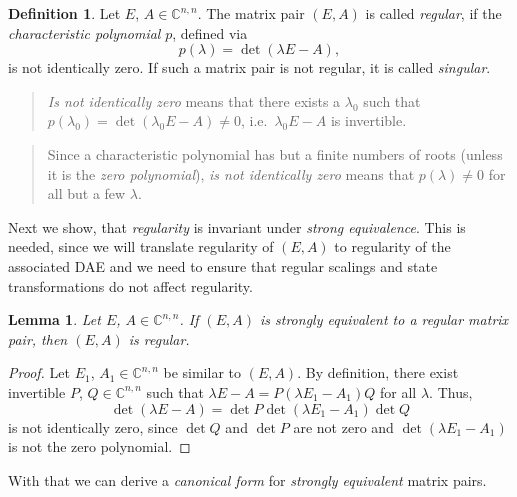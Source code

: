 \documentclass[]{book}
\newenvironment {JHSAYS} [0] {\begin{quote}\color{jhsc}} {\end{quote}}
\newtheorem{lemma}{Lemma}[chapter]
\theoremstyle{definition}
\newtheorem{definition}{Definition}[chapter]
\theoremstyle{definition}
\theoremstyle{definition}
\theoremstyle{remark}
\begin{document}
\begin{definition}
\protect\hypertarget{def:regularity}{}{\label{def:regularity} }Let \(E\), \(A \in \mathbb C^{n,n}\). The matrix pair \((E, A)\) is called \emph{regular}, if the \emph{characteristic polynomial} \(p\), defined via
\[
p(\lambda) = \det (\lambda E- A),
\]
is not identically zero. If such a matrix pair is not regular, it is called \emph{singular}.
\end{definition}

\begin{JHSAYS}
\emph{Is not identically zero} means that there exists a \(\lambda_0\)
such that \(p(\lambda_0)=\det (\lambda_0 E - A) \neq 0\),
i.e.~\(\lambda_0 E - A\) is invertible.
\end{JHSAYS}

\begin{JHSAYS}
Since a characteristic polynomial has but a finite numbers of roots
(unless it is the \emph{zero polynomial}), \emph{is not identically
zero} means that \(p(\lambda) \neq 0\) for all but a few \(\lambda\).
\end{JHSAYS}

Next we show, that \emph{regularity} is invariant under \emph{strong equivalence}. This is needed, since we will translate regularity of \((E,A)\) to regularity of the associated DAE and we need to ensure that regular scalings and state transformations do not affect regularity.

\begin{lemma}
\protect\hypertarget{lem:invariance-regularity}{}{\label{lem:invariance-regularity} }Let \(E\), \(A \in \mathbb C^{n,n}\). If \((E, A)\) is strongly equivalent to a regular matrix pair, then \((E, A)\) is regular.
\end{lemma}

\begin{proof}
{}Let \(E_1\), \(A_1 \in \mathbb C^{n, n}\) be similar to \((E, A)\). By definition, there exist invertible \(P\), \(Q\in \mathbb C^{n,n}\) such that \(\lambda E - A = P(\lambda E_1 -A_1)Q\) for all \(\lambda\). Thus,
\[
\det (\lambda E - A) = \det P \det (\lambda E_1 - A_1) \det Q
\]
is not identically zero, since \(\det Q\) and \(\det P\) are not zero and \(\det (\lambda E_1 - A_1)\) is not the zero polynomial.
\end{proof}

With that we can derive a \emph{canonical form} for \emph{strongly equivalent} matrix pairs.
\end{document}
